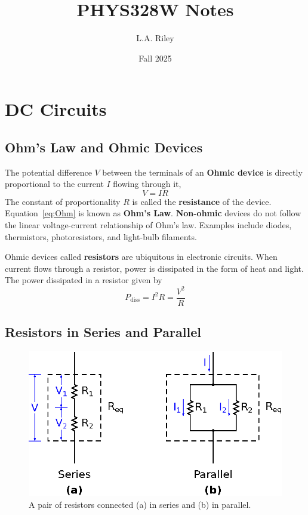 \documentclass[11pt]{article}
\title{PHYS328W Notes} \author{L.A. Riley} \date{Fall 2025}
\begin{document}
\thispagestyle{empty}

\maketitle

\section{DC Circuits}

\subsection{Ohm's Law and Ohmic Devices}
\label{sec:ohm}

The potential difference $V$ between the terminals of an \textbf{Ohmic
  device} is directly proportional to the current $I$ flowing through
it,
\begin{equation}
  V=IR
\label{eq:Ohm}
\end{equation}
The constant of proportionality $R$ is called the \textbf{resistance}
of the device. Equation~\ref{eq:Ohm} is known as \textbf{Ohm's Law}.
\textbf{Non-ohmic} devices do not follow the linear voltage-current
relationship of Ohm's law. Examples include diodes, thermistors,
photoresistors, and light-bulb filaments.

Ohmic devices called \textbf{resistors} are ubiquitous in electronic
circuits. When current flows through a resistor, power is dissipated
in the form of heat and light. The power dissipated in a resistor
given by
\begin{equation}
  P_\mathrm{diss} = I^2 R = \frac{V^2}{R}
\end{equation}

\subsection{Resistors in Series and Parallel}
\label{sec:serpar}

\begin{figure}[ht]
  \begin{center}
    \includegraphics{seriesparallel.eps}
    \caption{A pair of resistors connected (a) in series and (b) in
      parallel.}
    \label{fig:seriesparallel}
  \end{center}
\end{figure}
\end{document}
